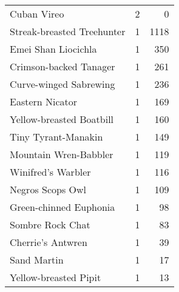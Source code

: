 \begin{longtable}{l r r}
Cuban Vireo                     &2    &0     \\
Streak-breasted Treehunter      &1    &1118  \\
Emei Shan Liocichla             &1    &350   \\
Crimson-backed Tanager          &1    &261   \\
Curve-winged Sabrewing          &1    &236   \\
Eastern Nicator                 &1    &169   \\
Yellow-breasted Boatbill        &1    &160   \\
Tiny Tyrant-Manakin             &1    &149   \\
Mountain Wren-Babbler           &1    &119   \\
Winifred's Warbler              &1    &116   \\
Negros Scops Owl                &1    &109   \\
Green-chinned Euphonia          &1    &98    \\
Sombre Rock Chat                &1    &83    \\
Cherrie's Antwren               &1    &39    \\
Sand Martin                     &1    &17    \\
Yellow-breasted Pipit           &1    &13    
  \end{longtable}
